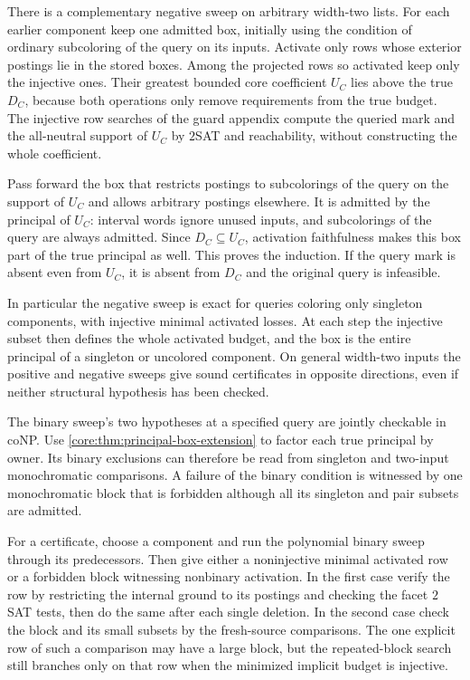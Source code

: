 There is a complementary negative sweep on arbitrary
width-two lists. For each earlier component keep
one admitted box, initially using the condition of
ordinary subcoloring of the query on its inputs.
Activate only rows whose exterior postings lie in
the stored boxes. Among the projected rows so
activated keep only the injective ones. Their
greatest bounded core coefficient $U_C$ lies above
the true $D_C$, because both operations only remove
requirements from the true budget. The injective
row searches of the guard appendix compute the
queried mark and the all-neutral support of $U_C$
by $2$SAT and reachability, without constructing
the whole coefficient.

Pass forward the box that restricts postings to
subcolorings of the query on the support of $U_C$
and allows arbitrary postings elsewhere. It is
admitted by the principal of $U_C$: interval words
ignore unused inputs, and subcolorings of the query
are always admitted. Since $D_C\subseteq U_C$,
activation faithfulness makes this box part of the
true principal as well. This proves the induction.
If the query mark is absent even from $U_C$, it is
absent from $D_C$ and the original query is
infeasible.

In particular the negative sweep is exact for
queries coloring only singleton components, with
injective minimal activated losses. At each step
the injective subset then defines the whole
activated budget, and the box is the entire
principal of a singleton or uncolored component. On general
width-two inputs the positive and negative
sweeps give sound certificates in opposite
directions, even if neither structural hypothesis
has been checked.

The binary sweep's two hypotheses at a specified
query are jointly checkable in coNP. Use
\cref{core:thm:principal-box-extension} to factor
each true principal by owner. Its binary exclusions
can therefore be read from singleton and two-input
monochromatic comparisons. A failure of the binary
condition is witnessed by one monochromatic block
that is forbidden although all its singleton and
pair subsets are admitted.

For a certificate, choose a component and run the
polynomial binary sweep through its predecessors.
Then give either a noninjective minimal activated
row or a forbidden block witnessing nonbinary
activation. In the first case verify the row by
restricting the internal ground to its postings and
checking the facet $2$SAT tests, then do the same
after each single deletion. In the second case
check the block and its small subsets by the
fresh-source comparisons. The one explicit row
of such a comparison may have a large block, but
the repeated-block search still branches only on
that row when the minimized implicit budget is
injective.

